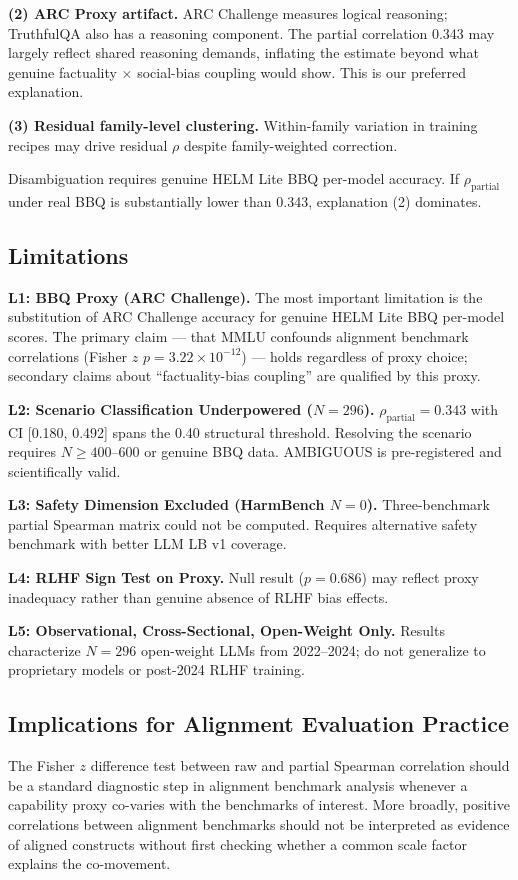 \textbf{(2) ARC Proxy artifact.} ARC Challenge measures logical reasoning; TruthfulQA also has a reasoning component. The partial correlation 0.343 may largely reflect shared reasoning demands, inflating the estimate beyond what genuine factuality $\times$ social-bias coupling would show. This is our preferred explanation.

\textbf{(3) Residual family-level clustering.} Within-family variation in training recipes may drive residual $\rho$ despite family-weighted correction.

Disambiguation requires genuine HELM Lite BBQ per-model accuracy. If $\rho_{\text{partial}}$ under real BBQ is substantially lower than 0.343, explanation (2) dominates.

\subsection{Limitations}

\textbf{L1: BBQ Proxy (ARC Challenge).} The most important limitation is the substitution of ARC Challenge accuracy for genuine HELM Lite BBQ per-model scores. The primary claim --- that MMLU confounds alignment benchmark correlations (Fisher $z$ $p = 3.22 \times 10^{-12}$) --- holds regardless of proxy choice; secondary claims about ``factuality-bias coupling'' are qualified by this proxy.

\textbf{L2: Scenario Classification Underpowered ($N{=}296$).} $\rho_{\text{partial}} = 0.343$ with CI [0.180, 0.492] spans the 0.40 structural threshold. Resolving the scenario requires $N \geq 400$--$600$ or genuine BBQ data. AMBIGUOUS is pre-registered and scientifically valid.

\textbf{L3: Safety Dimension Excluded (HarmBench $N{=}0$).} Three-benchmark partial Spearman matrix could not be computed. Requires alternative safety benchmark with better LLM LB v1 coverage.

\textbf{L4: RLHF Sign Test on Proxy.} Null result ($p = 0.686$) may reflect proxy inadequacy rather than genuine absence of RLHF bias effects.

\textbf{L5: Observational, Cross-Sectional, Open-Weight Only.} Results characterize $N{=}296$ open-weight LLMs from 2022--2024; do not generalize to proprietary models or post-2024 RLHF training.

\subsection{Implications for Alignment Evaluation Practice}

The Fisher $z$ difference test between raw and partial Spearman correlation should be a standard diagnostic step in alignment benchmark analysis whenever a capability proxy co-varies with the benchmarks of interest. More broadly, positive correlations between alignment benchmarks should not be interpreted as evidence of aligned constructs without first checking whether a common scale factor explains the co-movement.
